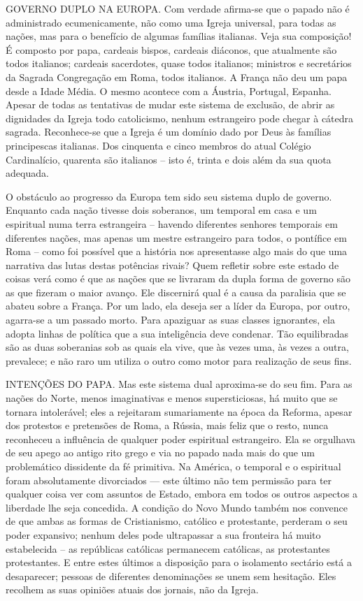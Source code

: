\documentclass[11pt,a5paper,twoside,openany]{book}
\begin{document}
GOVERNO DUPLO NA EUROPA. Com verdade afirma-se que o papado não é administrado ecumenicamente, não como uma Igreja universal, para todas as nações, mas para o benefício de algumas famílias italianas. Veja sua composição! É composto por papa, cardeais bispos, cardeais diáconos, que atualmente são todos italianos; cardeais sacerdotes, quase todos italianos; ministros e secretários da Sagrada Congregação em Roma, todos italianos. A França não deu um papa desde a Idade Média. O mesmo acontece com a Áustria, Portugal, Espanha. Apesar de todas as tentativas de mudar este sistema de exclusão, de abrir as dignidades da Igreja todo catolicismo, nenhum estrangeiro pode chegar à cátedra sagrada. Reconhece-se que a Igreja é um domínio dado por Deus às famílias principescas italianas. Dos cinquenta e cinco membros do atual Colégio Cardinalício, quarenta são italianos – isto é, trinta e dois além da sua quota adequada.

O obstáculo ao progresso da Europa tem sido seu sistema duplo de governo. Enquanto cada nação tivesse dois soberanos, um temporal em casa e um espiritual numa terra estrangeira – havendo diferentes senhores temporais em diferentes nações, mas apenas um mestre estrangeiro para todos, o pontífice em Roma – como foi possível que a história nos apresentasse algo mais do que uma narrativa das lutas destas potências rivais? Quem refletir sobre este estado de coisas verá como é que as nações que se livraram da dupla forma de governo são as que fizeram o maior avanço. Ele discernirá qual é a causa da paralisia que se abateu sobre a França. Por um lado, ela deseja ser a líder da Europa, por outro, agarra-se a um passado morto. Para apaziguar as suas classes ignorantes, ela adopta linhas de política que a sua inteligência deve condenar. Tão equilibradas são as duas soberanias sob as quais ela vive, que às vezes uma, às vezes a outra, prevalece; e não raro um utiliza o outro como motor para realização de seus fins.

INTENÇÕES DO PAPA. Mas este sistema dual aproxima-se do seu fim. Para as nações do Norte, menos imaginativas e menos supersticiosas, há muito que se tornara intolerável; eles a rejeitaram sumariamente na época da Reforma, apesar dos protestos e pretensões de Roma, a Rússia, mais feliz que o resto, nunca reconheceu a influência de qualquer poder espiritual estrangeiro. Ela se orgulhava de seu apego ao antigo rito grego e via no papado nada mais do que um problemático dissidente da fé primitiva. Na América, o temporal e o espiritual foram absolutamente divorciados — este último não tem permissão para ter qualquer coisa ver com assuntos de Estado, embora em todos os outros aspectos a liberdade lhe seja concedida. A condição do Novo Mundo também nos convence de que ambas as formas de Cristianismo, católico e protestante, perderam o seu poder expansivo; nenhum deles pode ultrapassar a sua fronteira há muito estabelecida – as repúblicas católicas permanecem católicas, as protestantes protestantes. E entre estes últimos a disposição para o isolamento sectário está a desaparecer; pessoas de diferentes denominações se unem sem hesitação. Eles recolhem as suas opiniões atuais dos jornais, não da Igreja.
\end{document}
